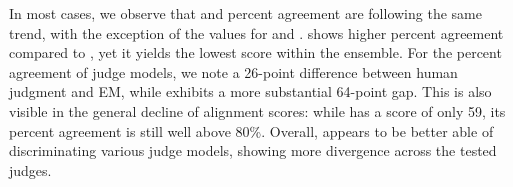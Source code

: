
In most cases, we observe that \scottspi and percent agreement are following the same trend, with the exception of the values for  and .
 shows higher percent agreement compared to , yet it yields the lowest \scottspi score within the ensemble.
For the percent agreement of judge models, we note a 26-point difference between human judgment and EM, while \scottspi exhibits a more substantial 64-point gap. 
This is also visible in the general decline of alignment scores: while  has a \scottspi score of only 59, its percent agreement is still well above 80\%.
Overall, \scottspi appears to be better able of discriminating various judge models, showing more divergence across the tested judges.

